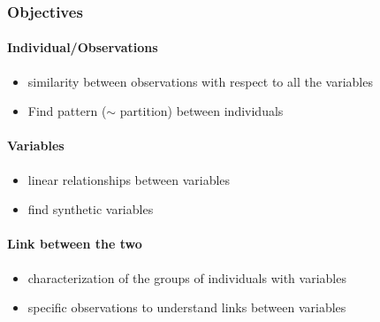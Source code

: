 \documentclass{beamer}\usepackage[]{graphicx}\usepackage[]{color}
\begin{document}
\begin{frame}
  \frametitle{Objectives}
  
\paragraph{Individual/Observations}
  
  \begin{itemize}
    \item similarity between observations with respect to all the variables 
    \item Find pattern ($\sim$ partition) between individuals
  \end{itemize}

\vfill

\paragraph{Variables} 
  
  \begin{itemize}
  \item linear relationships between variables 
  \item find synthetic variables
  \end{itemize}

\vfill

\paragraph{Link between the two}
  
  \begin{itemize}
    \item characterization of the groups of individuals with variables
    \item specific observations to understand links between variables
  \end{itemize}

\end{frame}




\end{document}
